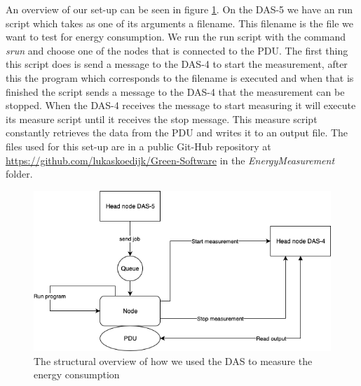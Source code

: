 An overview of our set-up can be seen in figure \ref{fig:overview}. On the DAS-5 we have an run script which takes as one of its arguments a filename. This filename is the file we want to test for energy consumption. We run the run script with the command \textit{srun} and choose one of the nodes that is connected to the PDU. The first thing this script does is send a message to the DAS-4 to start the measurement, after this the program which corresponds to the filename is executed and when that is finished the script sends a message to the DAS-4 that the measurement can be stopped. When the DAS-4 receives the message to start measuring it will execute its measure script until it receives the stop message. This measure script constantly retrieves the data from the PDU and writes it to an output file. The files used for this set-up are in a public Git-Hub repository at \url{https://github.com/lukaskoedijk/Green-Software} in the \textit{EnergyMeasurement} folder.

\begin{figure}[h]
    \centering
    \includegraphics[width=.6\textwidth]{graphs/das.png}
    \caption{The structural overview of how we used the DAS to measure the energy consumption}
    \label{fig:overview}
\end{figure}
